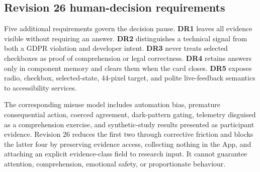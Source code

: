 

\subsection{Revision 26 human-decision requirements}

Five additional requirements govern the decision pause. \textbf{DR1} leaves all evidence visible without requiring an answer. \textbf{DR2} distinguishes a technical signal from both a GDPR violation and developer intent. \textbf{DR3} never treats selected checkboxes as proof of comprehension or legal correctness. \textbf{DR4} retains answers only in component memory and clears them when the card closes. \textbf{DR5} exposes radio, checkbox, selected-state, 44-pixel target, and polite live-feedback semantics to accessibility services.

The corresponding misuse model includes automation bias, premature consequential action, coerced agreement, dark-pattern gating, telemetry disguised as a comprehension exercise, and synthetic-study results presented as participant evidence. Revision 26 reduces the first two through corrective friction and blocks the latter four by preserving evidence access, collecting nothing in the App, and attaching an explicit evidence-class field to research input. It cannot guarantee attention, comprehension, emotional safety, or proportionate behaviour.
